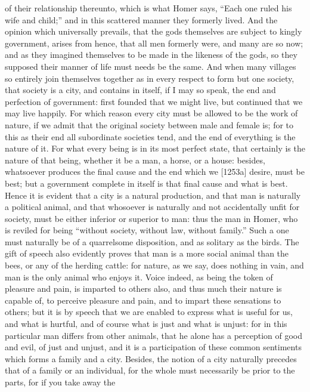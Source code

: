 of their relationship thereunto, which is what Homer says, ``Each one ruled
his wife and child;'' and in this scattered manner they formerly lived. And
the opinion which universally prevails, that the gods themselves are
subject to kingly government, arises from hence, that all men formerly
were, and many are so now; and as they imagined themselves to be made in
the likeness of the gods, so they supposed their manner of life must needs
be the same. And when many villages so entirely join themselves together
as in every respect to form but one society, that society is a city, and
contains in itself, if I may so speak, the end and perfection of
government: first founded that we might live, but continued that we may
live happily. For which reason every city must be allowed to be the work
of nature, if we admit that the original society between male and female
is; for to this as their end all subordinate societies tend, and the end
of everything is the nature of it. For what every being is in its most
perfect state, that certainly is the nature of that being, whether it be a
man, a horse, or a house: besides, whatsoever produces the final cause and
the end which we [1253a] desire, must be best; but a government complete
in itself is that final cause and what is best. Hence it is evident that a
city is a natural production, and that man is naturally a political
animal, and that whosoever is naturally and not accidentally unfit for
society, must be either inferior or superior to man: thus the man in
Homer, who is reviled for being ``without society, without law, without
family.'' Such a one must naturally be of a quarrelsome disposition, and as
solitary as the birds. The gift of speech also evidently proves that man
is a more social animal than the bees, or any of the herding cattle: for
nature, as we say, does nothing in vain, and man is the only animal who
enjoys it. Voice indeed, as being the token of pleasure and pain, is
imparted to others also, and thus much their nature is capable of, to
perceive pleasure and pain, and to impart these sensations to others; but
it is by speech that we are enabled to express what is useful for us, and
what is hurtful, and of course what is just and what is unjust: for in
this particular man differs from other animals, that he alone has a
perception of good and evil, of just and unjust, and it is a participation
of these common sentiments which forms a family and a city. Besides, the
notion of a city naturally precedes that of a family or an individual, for
the whole must necessarily be prior to the parts, for if you take away the

